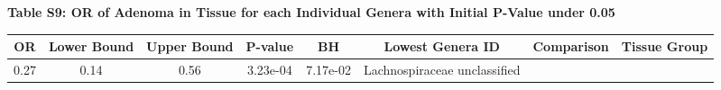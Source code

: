 \documentclass[12pt,]{article}
\begin{document}
\newpage

\textbf{Table S9: OR of Adenoma in Tissue for each Individual Genera
with Initial P-Value under 0.05}

\begin{longtable}[]{@{}cccccccc@{}}
\toprule
\begin{minipage}[b]{0.05\columnwidth}\centering\strut
OR\strut
\end{minipage} & \begin{minipage}[b]{0.09\columnwidth}\centering\strut
Lower Bound\strut
\end{minipage} & \begin{minipage}[b]{0.09\columnwidth}\centering\strut
Upper Bound\strut
\end{minipage} & \begin{minipage}[b]{0.07\columnwidth}\centering\strut
P-value\strut
\end{minipage} & \begin{minipage}[b]{0.07\columnwidth}\centering\strut
BH\strut
\end{minipage} & \begin{minipage}[b]{0.20\columnwidth}\centering\strut
Lowest Genera ID\strut
\end{minipage} & \begin{minipage}[b]{0.14\columnwidth}\centering\strut
Comparison\strut
\end{minipage} & \begin{minipage}[b]{0.09\columnwidth}\centering\strut
Tissue Group\strut
\end{minipage}\tabularnewline
\midrule
\endhead
\begin{minipage}[t]{0.05\columnwidth}\centering\strut
0.27\strut
\end{minipage} & \begin{minipage}[t]{0.09\columnwidth}\centering\strut
0.14\strut
\end{minipage} & \begin{minipage}[t]{0.09\columnwidth}\centering\strut
0.56\strut
\end{minipage} & \begin{minipage}[t]{0.07\columnwidth}\centering\strut
3.23e-04\strut
\end{minipage} & \begin{minipage}[t]{0.07\columnwidth}\centering\strut
7.17e-02\strut
\end{minipage} & \begin{minipage}[t]{0.20\columnwidth}\centering\strut
Lachnospiraceae unclassified\strut
\end{minipage} & \begin{minipage}[t]{0.14\columnwidth}\centering\strut

\end{minipage}
\end{longtable}
\end{document}
